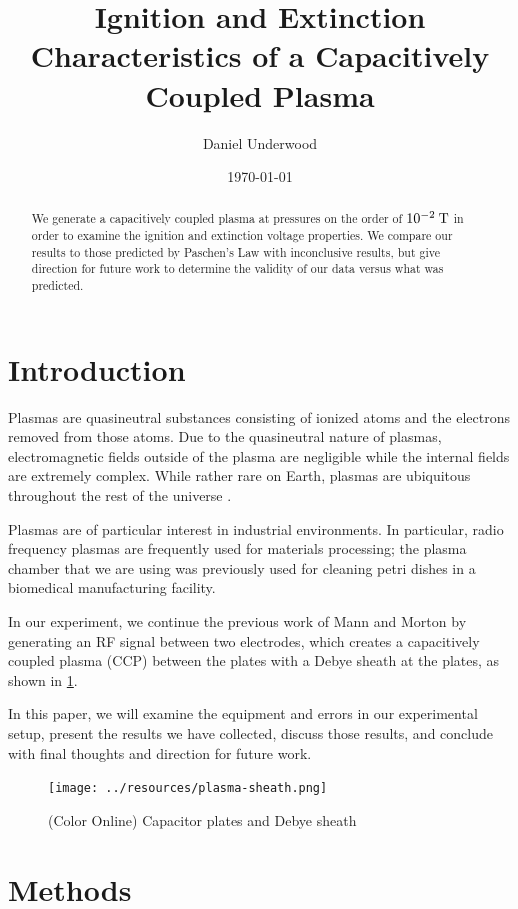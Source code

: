 \documentclass[reprint]{revtex4-1}
\begin{document}
\title{Ignition and Extinction Characteristics of a Capacitively Coupled Plasma}
\author{Daniel Underwood}
\date{\today}

\begin{abstract}
We generate a capacitively coupled plasma at pressures on the order of $10^{-2}\:\rm{T}$ in order to examine the ignition and extinction voltage properties. We compare our results to those predicted by Paschen's Law with inconclusive results, but give direction for future work to determine the validity of our data versus what was predicted.
\end{abstract}
\maketitle

\section{Introduction}
Plasmas are quasineutral substances consisting of ionized atoms and the electrons removed from those atoms. Due to the quasineutral nature of plasmas, electromagnetic fields outside of the plasma are negligible while the internal fields are extremely complex. While rather rare on Earth, plasmas are ubiquitous throughout the rest of the universe \cite{F.F.Chen1989}.

Plasmas are of particular interest in industrial environments. In particular, radio frequency plasmas are frequently used for materials processing; the plasma chamber that we are using was previously used for cleaning petri dishes in a biomedical manufacturing facility.

In our experiment, we continue the previous work of Mann and Morton \cite{Mann2015} by generating an RF signal between two electrodes, which creates a capacitively coupled plasma (CCP) between the plates with a Debye sheath at the plates, as shown in \cref{fig:plasma-sheath}.

In this paper, we will examine the equipment and errors in our experimental setup, present the results we have collected, discuss those results, and conclude with final thoughts and direction for future work.

\begin{figure}[h]
\texttt{[image: ../resources/plasma-sheath.png]}
\caption{(Color Online) Capacitor plates and Debye sheath}
\label{fig:plasma-sheath}
\end{figure}

\section{Methods}
\end{document}
